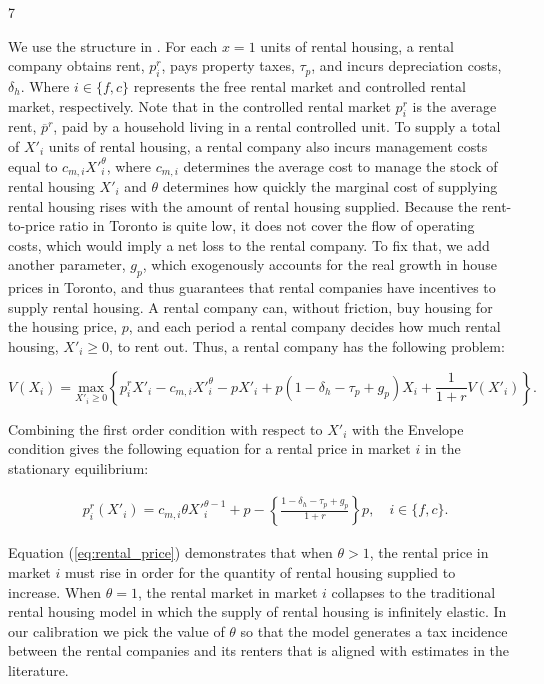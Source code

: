 7\documentclass[parskip=full]{article}
\begin{document}
We use the structure in \citet{garrigaeetal-2009}. For each $x=1$ units of rental housing, a rental company obtains rent, $p^{r}_{i}$, pays property taxes, $\tau_{p}$, and incurs depreciation costs, $\delta_{h}$. Where $i \in \{f,c\}$ represents the free rental market and controlled rental market, respectively. Note that in the controlled rental market $p^{r}_{i}$ is the average rent, $\overline{p}^{r}$, paid by a household living in a rental controlled unit. To supply a total of $X'_{i}$ units of rental housing, a rental company also incurs management costs equal to $c_{m,i}X'^{\theta}_{i}$, where $c_{m,i}$ determines the average cost to manage the stock of rental housing $X'_{i}$ and $\theta$ determines how quickly the marginal cost of supplying rental housing rises with the amount of rental housing supplied. Because the rent-to-price ratio in Toronto is quite low, it does not cover the flow of operating costs, which would imply a net loss to the rental company. To fix that, we add another parameter, $g_{p}$, which exogenously accounts for the real growth in house prices in Toronto, and thus guarantees that rental companies have incentives to supply rental housing. A rental company can, without friction, buy housing for the housing price, $p$, and each period a rental company decides how much rental housing, $X'_{i} \geq 0$, to rent out. Thus, a rental company has the following problem:

\begin{equation*}
V(X_{i})=\underset{X'_{i} \geq 0} {\text{$\mbox{max} $}}\left\{p^{r}_{i}X'_{i}-c_{m,i}X'^{\theta}_{i}-p X'_{i}+p(1-\delta_{h}-\tau_{p}+g_{p})X_{i}+\frac{1}{1+r}V(X'_{i})\right\}.
\end{equation*}

\noindent Combining the first order condition with respect to $X'_{i}$ with the Envelope condition gives the following equation for a rental price in market $i$ in the stationary equilibrium:

\begin{align}
&p^{r}_{i}(X'_{i})=c_{m,i}\theta X'^{\theta-1}_{i}+p-\left\{\frac{1-\delta_{h}-\tau_p+g_{p}}{1+r}\right\}p, \quad i \in \{f,c\}.\label{eq:rental_price}
\end{align}

\noindent Equation (\ref{eq:rental_price}) demonstrates that when $\theta>1$, the rental price in market $i$ must rise in order for the quantity of rental housing supplied to increase. When $\theta=1$, the rental market in market $i$ collapses to the traditional rental housing model in which the supply of rental housing is infinitely elastic. In our calibration we pick the value of $\theta$ so that the model generates a tax incidence between the rental companies and its renters that is aligned with estimates in the literature.
\end{document}
